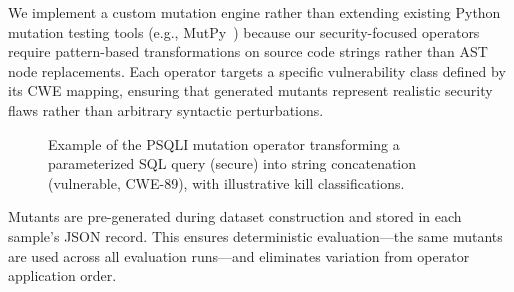 \documentclass[sigconf,anonymous,review]{acmart}
\begin{document}
We implement a custom mutation engine rather than extending existing Python mutation testing tools (e.g., MutPy~\cite{derezinska2014experimental}) because our security-focused operators require pattern-based transformations on source code strings rather than AST node replacements. Each operator targets a specific vulnerability class defined by its CWE mapping, ensuring that generated mutants represent realistic security flaws rather than arbitrary syntactic perturbations.

\begin{figure}[t]
  \centering
  \caption{Example of the PSQLI mutation operator transforming a parameterized SQL query (secure) into string concatenation (vulnerable, CWE-89), with illustrative kill classifications.}
  \label{fig:mutation_example}
\end{figure}

Mutants are pre-generated during dataset construction and stored in each sample's JSON record. This ensures deterministic evaluation---the same mutants are used across all evaluation runs---and eliminates variation from operator application order.
\end{document}
